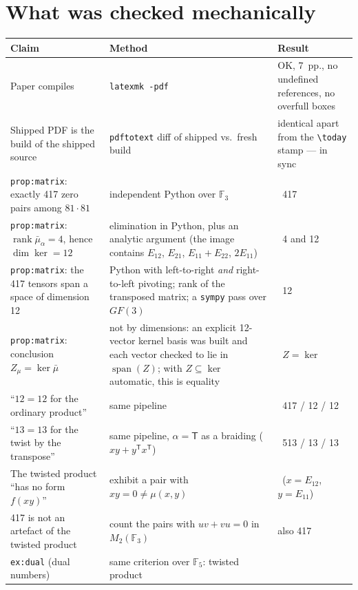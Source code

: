 \documentclass[11pt,a4paper]{article}
\newcommand{\yes}{\checkmark}
\newcommand{\cpt}[1]{\texttt{#1}}          %
\begin{document}
\section{What was checked mechanically}
\label{sec:mech}

\begin{center}\small
\begin{tabular}{@{}L{0.275\textwidth}L{0.36\textwidth}L{0.29\textwidth}@{}}
\toprule
\textbf{Claim} & \textbf{Method} & \textbf{Result}\\
\midrule
Paper compiles & \cpt{latexmk -pdf} & OK, 7~pp., no undefined references, no overfull boxes\\
\midrule
Shipped PDF is the build of the shipped source & \cpt{pdftotext} diff of shipped vs.\ fresh build
  & identical apart from the \cpt{\textbackslash today} stamp --- in sync\\
\midrule
\cpt{prop:matrix}: exactly 417 zero pairs among $81\cdot81$ & independent Python over $\mathbb{F}_3$
  & \yes\ 417\\
\cpt{prop:matrix}: $\operatorname{rank}\bar\mu_\alpha = 4$, hence $\dim\ker = 12$
  & elimination in Python, plus an analytic argument (the image contains $E_{12}$, $E_{21}$,
    $E_{11}+E_{22}$, $2E_{11}$) & \yes\ 4 and 12\\
\cpt{prop:matrix}: the 417 tensors span a space of dimension 12
  & Python with left-to-right \emph{and} right-to-left pivoting; rank of the transposed matrix; a
    \cpt{sympy} pass over $GF(3)$ & \yes\ 12\\
\cpt{prop:matrix}: conclusion $Z_\mu = \ker\bar\mu$
  & not by dimensions: an explicit 12-vector kernel basis was built and each vector checked to lie in
    $\operatorname{span}(Z)$; with $Z \subseteq \ker$ automatic, this is equality & \yes\ $Z=\ker$\\
\midrule
``$12=12$ for the ordinary product'' & same pipeline & \yes\ 417 / 12 / 12\\
``$13=13$ for the twist by the transpose'' & same pipeline, $\alpha=\mathsf{T}$ as a braiding
  ($xy + y^{\mathsf T}x^{\mathsf T}$) & \yes\ 513 / 13 / 13\\
\midrule
The twisted product ``has no form $f(xy)$'' & exhibit a pair with $xy=0 \ne \mu(x,y)$
  & \yes\ ($x=E_{12}$, $y=E_{11}$)\\
417 is not an artefact of the twisted product & count the pairs with $uv+vu=0$ in $M_2(\mathbb{F}_3)$
  & also 417 \yes\\
\cpt{ex:dual} (dual numbers) & same criterion over $\mathbb{F}_5$: twisted product

\end{tabular}
\end{center}
\end{document}
